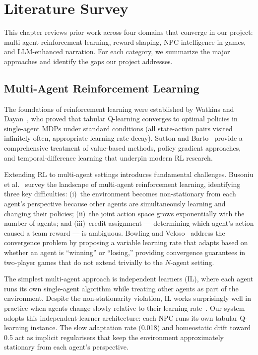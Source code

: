 \documentclass[12pt, a4paper, oneside]{report}
\begin{document}
\chapter{Literature Survey}
\label{chap:literature}

This chapter reviews prior work across four domains that converge in our project: multi-agent reinforcement learning, reward shaping, NPC intelligence in games, and LLM-enhanced narration. For each category, we summarize the major approaches and identify the gaps our project addresses.

\section{Multi-Agent Reinforcement Learning}
\label{sec:marl}

The foundations of reinforcement learning were established by Watkins and Dayan~\cite{watkins1992qlearning}, who proved that tabular Q-learning converges to optimal policies in single-agent MDPs under standard conditions (all state-action pairs visited infinitely often, appropriate learning rate decay). Sutton and Barto~\cite{sutton2018rl} provide a comprehensive treatment of value-based methods, policy gradient approaches, and temporal-difference learning that underpin modern RL research.

Extending RL to multi-agent settings introduces fundamental challenges. Busoniu et al.~\cite{busoniu2008marl} survey the landscape of multi-agent reinforcement learning, identifying three key difficulties: (i)~the environment becomes non-stationary from each agent's perspective because other agents are simultaneously learning and changing their policies; (ii)~the joint action space grows exponentially with the number of agents; and (iii)~credit assignment --- determining which agent's action caused a team reward --- is ambiguous. Bowling and Veloso~\cite{bowling2002multiagent} address the convergence problem by proposing a variable learning rate that adapts based on whether an agent is ``winning'' or ``losing,'' providing convergence guarantees in two-player games that do not extend trivially to the $N$-agent setting.

The simplest multi-agent approach is independent learners (IL), where each agent runs its own single-agent algorithm while treating other agents as part of the environment. Despite the non-stationarity violation, IL works surprisingly well in practice when agents change slowly relative to their learning rate~\cite{busoniu2008marl}. Our system adopts this independent-learner architecture: each NPC runs its own tabular Q-learning instance. The slow adaptation rate (0.018) and homeostatic drift toward 0.5 act as implicit regularisers that keep the environment approximately stationary from each agent's perspective.
\end{document}
